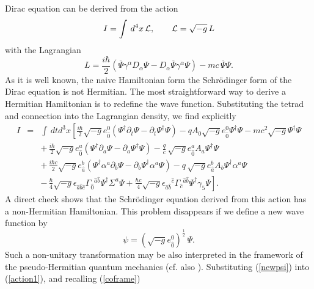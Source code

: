 \documentclass[preprint,showpacs,preprintnumbers,eqsecnum,amsmath,amssymb]{revtex4}
\begin{document}
Dirac equation can be derived from the action
\begin{equation}
I = \int\,d^4x\,{\cal L},\qquad {\cal L} =
\sqrt{-g}\,L\label{action}
\end{equation}
with the Lagrangian
\begin{equation}\label{LD}
L = {\frac {i\hbar}{2}}\left(\overline{\Psi}\gamma^\alpha
D_\alpha\Psi - D_\alpha\overline{\Psi}\gamma^\alpha\Psi\right) -
mc\,\overline{\Psi}\Psi.
\end{equation}
As it is well known, the naive Hamiltonian form the Schr\"odinger
form of the Dirac equation is not Hermitian. The most
straightforward way to derive a Hermitian Hamiltonian is to
redefine the wave function. Substituting the tetrad and connection
into the Lagrangian density, we find explicitly
\begin{eqnarray}
I &=& \int\,dtd^3x\left[{\frac {i\hbar}{2}}\sqrt{-g}e_{\widehat{0}}^0\left(
\Psi^\dagger\partial_t\Psi - \partial_t\Psi^\dagger\Psi\right) - qA_0\sqrt{-g}
e_{\widehat{0}}^0\Psi^\dagger\Psi -mc^2\sqrt{-g}\Psi^\dagger\Psi\right.\nonumber\\
&& +\,{\frac {i\hbar}{2}}\sqrt{-g}e_{\widehat{0}}^a\left(\Psi^\dagger\partial_a
\Psi - \partial_a\Psi^\dagger\Psi\right) - {\frac qc}
\,\sqrt{-g}e_{\widehat{0}}^aA_a\Psi^\dagger\Psi\nonumber\\
&& +\,{\frac {i\hbar c}{2}}\sqrt{-g}e_{\widehat{a}}^b\left(\Psi^\dagger\alpha^a
\partial_b\Psi - \partial_b\Psi^\dagger\alpha^a\Psi\right) - q\,\sqrt{-g}
e_{\widehat{a}}^bA_b\Psi^\dagger\alpha^a\Psi\nonumber\\ \label{action1}
&& -\,\left. {\frac \hbar 4}\sqrt{-g}\epsilon_{\widehat{a}\widehat{b}\widehat{c}}
\Gamma_{\widehat{0}}{}^{\widehat{a}\widehat{b}}\Psi^\dagger\Sigma^a\Psi
+ {\frac {\hbar c} 4}\sqrt{-g}\epsilon_{\widehat{a}\widehat{b}}{}^{\widehat{c}}
\Gamma_{\widehat{c}}{}^{\widehat{a}\widehat{b}}\Psi^\dagger\gamma_5\Psi\right].
\end{eqnarray}
A direct check shows that the Schr\"odinger equation derived from
this action has a non-Hermitian Hamiltonian. This problem
disappears if we define a new wave function by
\begin{equation}
\psi = \left(\sqrt{-g}e_{\widehat{0}}^0\right)^{\frac
12}\,\Psi.\label{newpsi}
\end{equation}
Such a non-unitary transformation may be also interpreted in the
framework of the pseudo-Hermitian quantum mechanics
\cite{GorNezn,GorNeznnew} (cf. also \cite{lec}). Substituting
(\ref{newpsi}) into (\ref{action1}), and recalling (\ref{coframe})
\end{document}

